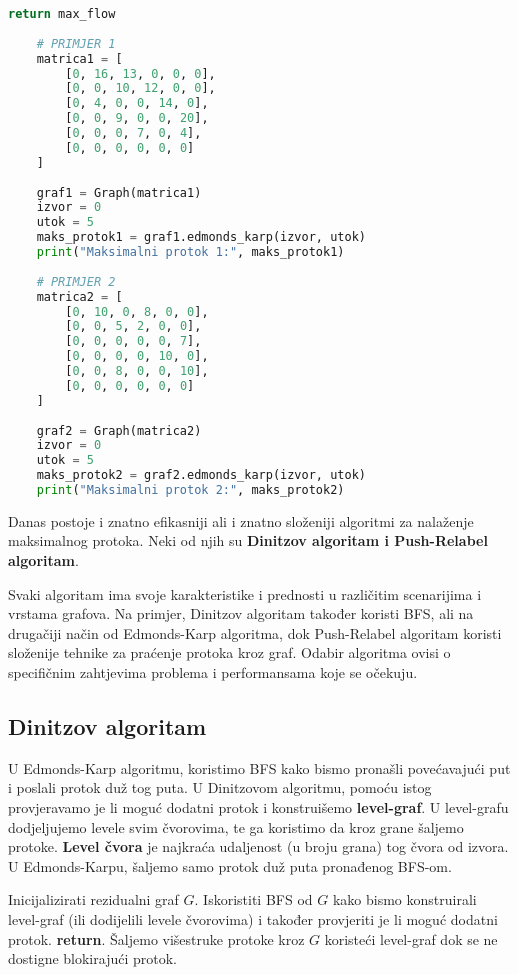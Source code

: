 \documentclass[11pt, a4paper]{article}
\begin{document}
\begin{lstlisting}[language=Python]
			return max_flow
		
	# PRIMJER 1
	matrica1 = [
		[0, 16, 13, 0, 0, 0],
		[0, 0, 10, 12, 0, 0],
		[0, 4, 0, 0, 14, 0],
		[0, 0, 9, 0, 0, 20],
		[0, 0, 0, 7, 0, 4],
		[0, 0, 0, 0, 0, 0]
	]
				
	graf1 = Graph(matrica1)
	izvor = 0
	utok = 5
	maks_protok1 = graf1.edmonds_karp(izvor, utok)
	print("Maksimalni protok 1:", maks_protok1)
	
	# PRIMJER 2
	matrica2 = [
		[0, 10, 0, 8, 0, 0],
		[0, 0, 5, 2, 0, 0],
		[0, 0, 0, 0, 0, 7],
		[0, 0, 0, 0, 10, 0],
		[0, 0, 8, 0, 0, 10],
		[0, 0, 0, 0, 0, 0]
	]
				
	graf2 = Graph(matrica2)
	izvor = 0
	utok = 5
	maks_protok2 = graf2.edmonds_karp(izvor, utok)
	print("Maksimalni protok 2:", maks_protok2)
	\end{lstlisting}
		
	Danas postoje i znatno efikasniji ali i znatno složeniji algoritmi za nalaženje maksimalnog protoka. Neki od njih su \textbf{Dinitzov algoritam i Push-Relabel algoritam}.
	
	Svaki algoritam ima svoje karakteristike i prednosti u različitim scenarijima i vrstama grafova. Na primjer, Dinitzov algoritam također koristi BFS, ali na drugačiji način od Edmonds-Karp algoritma, dok Push-Relabel algoritam koristi složenije tehnike za praćenje protoka kroz graf. Odabir algoritma ovisi o specifičnim zahtjevima problema i performansama koje se očekuju.
	
	\newpage
	\subsection{Dinitzov algoritam}
	
	U Edmonds-Karp algoritmu, koristimo BFS kako bismo pronašli povećavajući put i poslali protok duž tog puta. U Dinitzovom algoritmu, pomoću istog provjeravamo je li moguć dodatni protok i konstruišemo \textbf{level-graf}. U level-grafu dodjeljujemo levele svim čvorovima, te ga koristimo da kroz grane šaljemo protoke. \textbf{Level čvora} je najkraća udaljenost (u broju grana) tog čvora od izvora. U Edmonds-Karpu, šaljemo samo protok duž puta pronađenog BFS-om.

	\hspace{1pt}
	\begin{algorithm}
		\renewcommand{\thealgorithm}{}
		\caption{}
		\begin{algorithmic}[1] %
			\STATE Inicijalizirati rezidualni graf $G$.
			\STATE Iskoristiti BFS od $G$ kako bismo konstruirali level-graf (ili dodijelili levele čvorovima) i također provjeriti je li moguć dodatni protok.
			\STATE \textbf{return}.
			\ENDIF
			\STATE Šaljemo višestruke protoke kroz $G$ koristeći level-graf dok se ne dostigne blokirajući protok.
		\end{algorithmic}
	\end{algorithm}
	\hspace{3pt}
	
\end{document}
